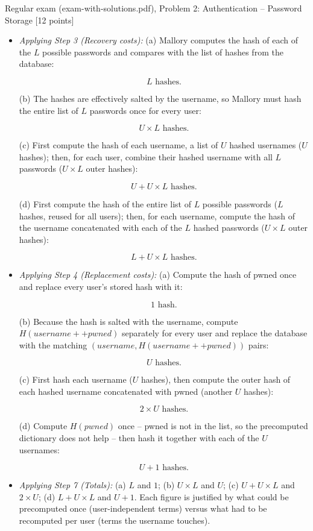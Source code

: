 \documentclass[12pt, a4paper]{article}
\begin{document}
\begin{practicebox}{Regular exam (exam-with-solutions.pdf), Problem 2: Authentication -- Password Storage [12 points]}
\begin{itemize}
    For the replacement attack, note: pwned is not in the list of $L$ passwords, so $H(pwned)$ must be computed fresh wherever an inner password hash is needed.
    \item \textit{Applying Step 3 (Recovery costs):} (a) Mallory computes the hash of each of the $L$ possible passwords and compares with the list of hashes from the database:

\[
L \text{ hashes.}
\]

(b) The hashes are effectively salted by the username, so Mallory must hash the entire list of $L$ passwords once for every user:

\[
U \times L \text{ hashes.}
\]

(c) First compute the hash of each username, a list of $U$ hashed usernames ($U$ hashes); then, for each user, combine their hashed username with all $L$ passwords ($U \times L$ outer hashes):

\[
U + U \times L \text{ hashes.}
\]

(d) First compute the hash of the entire list of $L$ possible passwords ($L$ hashes, reused for all users); then, for each username, compute the hash of the username concatenated with each of the $L$ hashed passwords ($U \times L$ outer hashes):

\[
L + U \times L \text{ hashes.}
\]

\item \textit{Applying Step 4 (Replacement costs):} (a) Compute the hash of pwned once and replace every user's stored hash with it:

\[
1 \text{ hash.}
\]

(b) Because the hash is salted with the username, compute $H(username ++ pwned)$ separately for every user and replace the database with the matching $(username, H(username ++ pwned))$ pairs:

\[
U \text{ hashes.}
\]

(c) First hash each username ($U$ hashes), then compute the outer hash of each hashed username concatenated with pwned (another $U$ hashes):

\[
2 \times U \text{ hashes.}
\]

(d) Compute $H(pwned)$ once -- pwned is not in the list, so the precomputed dictionary does not help -- then hash it together with each of the $U$ usernames:

\[
U + 1 \text{ hashes.}
\]

\item \textit{Applying Step 7 (Totals):} (a) $L$ and $1$; (b) $U \times L$ and $U$; (c) $U + U \times L$ and $2 \times U$; (d) $L + U \times L$ and $U + 1$. Each figure is justified by what could be precomputed once (user-independent terms) versus what had to be recomputed per user (terms the username touches).
\end{itemize}


\end{practicebox}
\end{document}
